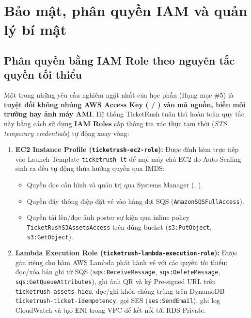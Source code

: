\chapter[Bảo mật và phân quyền IAM]{Bảo mật, phân quyền IAM và quản lý bí mật}

\section{Phân quyền bằng IAM Role theo nguyên tắc quyền tối thiểu}
Một trong những yêu cầu nghiêm ngặt nhất của học phần (Hạng mục \#5) là \textbf{tuyệt đối không nhúng AWS Access Key ( / ) vào mã nguồn, biến môi trường hay ảnh máy AMI}. Hệ thống TicketRush tuân thủ hoàn toàn quy tắc này bằng cách sử dụng \textbf{IAM Roles} cấp thông tin xác thực tạm thời (\textit{STS temporary credentials}) tự động xoay vòng:

\begin{enumerate}[leftmargin=1.5em]
  \item \textbf{EC2 Instance Profile (\texttt{ticketrush-ec2-role}):}
    Được đính kèm trực tiếp vào Launch Template \texttt{ticketrush-lt} để mọi máy chủ EC2 do Auto Scaling sinh ra đều tự động thừa hưởng quyền qua IMDS:
    \begin{itemize}[leftmargin=1.2em]
      \item Quyền đọc cấu hình và quản trị qua Systems Manager (, ).
      \item Quyền đẩy thông điệp đặt vé vào hàng đợi SQS (\texttt{AmazonSQSFullAccess}).
      \item Quyền tải lên/đọc ảnh poster sự kiện qua inline policy \texttt{TicketRushS3AssetsAccess} trên đúng bucket  (\texttt{s3:PutObject}, \texttt{s3:GetObject}).
    \end{itemize}
  \item \textbf{Lambda Execution Role (\texttt{ticketrush-lambda-execution-role}):}
    Được gán riêng cho hàm AWS Lambda phát hành vé với các quyền tối thiểu: đọc/xóa bản ghi từ SQS (\texttt{sqs:ReceiveMessage}, \texttt{sqs:DeleteMessage}, \texttt{sqs:GetQueueAttributes}), ghi ảnh QR và ký Pre-signed URL trên \texttt{ticketrush-assets-hieu}, đọc/ghi khóa chống trùng trên DynamoDB \texttt{ticketrush-ticket-idempotency}, gọi SES (\texttt{ses:SendEmail}), ghi log CloudWatch và tạo ENI trong VPC để kết nối tới RDS Private.
\end{enumerate}

